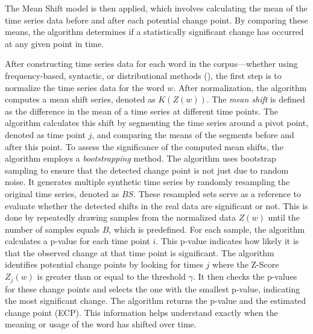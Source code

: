 The Mean Shift model is then applied, which involves calculating the mean of the time series data before and after each potential change point.
By comparing these means, the algorithm determines if a statistically significant change has occurred at any given point in time.


After constructing time series data for each word in the corpus—whether using frequency-based, syntactic, or distributional methods (), the first step is to normalize the time series data for the word $w$.
After normalization, the algorithm computes a mean shift series, denoted as $K(Z(w))$.
The \emph{mean shift} is defined as the difference in the mean of a time series at different time points.
The algorithm calculates this shift by segmenting the time series around a pivot point, denoted as time point $j$, and comparing the means of the segments before and after this point.
To assess the significance of the computed mean shifts, the algorithm employs a \emph{bootstrapping} method.
The algorithm uses bootstrap sampling to ensure that the detected change point is not just due to random noise.
It generates multiple synthetic time series by randomly resampling the original time series, denoted as $BS$.
These resampled sets serve as a reference to evaluate whether the detected shifts in the real data are significant or not.
This is done by repeatedly drawing samples from the normalized data $Z(w)$ until the number of samples equals $B$, which is predefined.
For each sample, the algorithm calculates a p-value for each time point $i$.
This p-value indicates how likely it is that the observed change at that time point is significant.
The algorithm identifies potential change points by looking for times $j$ where the Z-Score $Z_j(w)$ is greater than or equal to the threshold $\gamma$.
It then checks the p-values for these change points and selects the one with the smallest p-value, indicating the most significant change.
The algorithm returns the p-value and the estimated change point (ECP).
This information helps understand exactly when the meaning or usage of the word has shifted over time.

